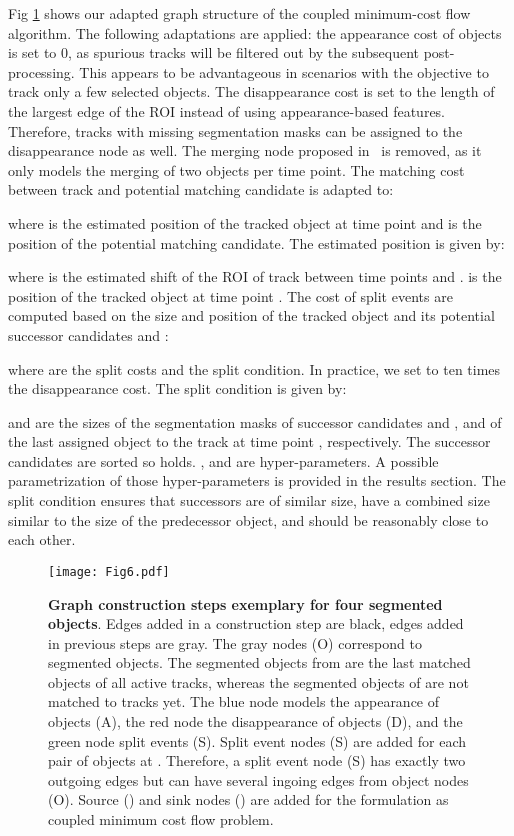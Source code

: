 \documentclass[10pt,letterpaper]{article}
\begin{document}
Fig \ref{fig:mcf_graph} shows our adapted graph structure of the coupled minimum-cost flow algorithm. The following adaptations are applied: the appearance cost of objects is set to 0, as spurious tracks will be filtered out by the subsequent post-processing. This appears to be advantageous in scenarios with the objective to track only a few selected objects. The disappearance cost is set to the length of the largest edge of the ROI instead of using appearance-based features. Therefore, tracks with missing segmentation masks can be assigned to the disappearance node as well. The merging node proposed in~\cite{Padfield2011} is removed, as it only models the merging of two objects per time point. The matching cost  between track  and potential matching candidate  is adapted to: 

where  is the estimated position of the tracked object  at time point  and  is the position of the potential matching candidate. The estimated position  is given by:  

where  is the estimated shift of the ROI of track  between time points  and .  is the position of the tracked object at time point . The cost of split events are computed based on the size and position of the tracked object  and its potential successor candidates  and :

where  are the split costs and  the split condition. In practice, we set  to ten times the disappearance cost. The split condition  is given by:

 and  are the sizes of the segmentation masks of successor candidates  and , and of the last assigned object to the track  at time point , respectively. The successor candidates are sorted so  holds. ,  and  are hyper-parameters. A possible parametrization of those hyper-parameters is provided in the results section. The split condition ensures that successors are of similar size, have a combined size similar to the size of the predecessor object, and should be reasonably close to each other. 
\begin{figure}
\begin{adjustwidth}{-2.25in}{0in}
\centering
\texttt{[image: Fig6.pdf]}
\caption{\textbf{Graph construction steps exemplary for four segmented objects}. Edges added in a construction step are black, edges added in previous steps are gray. The gray nodes (O) correspond to segmented objects. The segmented objects from  are the last matched objects of all active tracks, whereas the segmented objects of  are not matched to tracks yet. The blue node models the appearance of objects (A), the red node the disappearance of objects (D), and the green node split events (S). Split event nodes (S) are added for each pair of objects at . Therefore, a split event node (S) has exactly two outgoing edges but can have several ingoing edges from object nodes (O). Source () and sink nodes () are added for the formulation as coupled minimum cost flow problem.}
\label{fig:mcf_graph}
\end{adjustwidth}
\end{figure}
 
\end{document}
